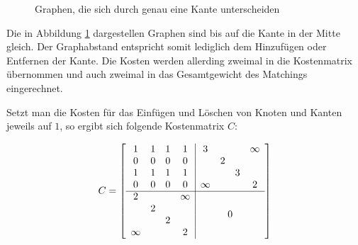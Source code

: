 \begin{figure}[htb]
\centering
\hspace*{\fill}
\hspace*{\fill}
\hspace*{\fill}
\caption{Graphen, die sich durch genau eine Kante unterscheiden}
\label{pic:BspBipMatching}
\end{figure}

Die in Abbildung \ref{pic:BspBipMatching} dargestellen Graphen sind bis auf die Kante 
in der Mitte gleich. Der Graphabstand entspricht somit lediglich dem Hinzufügen oder Entfernen 
der Kante. Die Kosten werden allerding zweimal in die Kostenmatrix übernommen und 
auch zweimal in das Gesamtgewicht des Matchings eingerechnet. 

Setzt man die Kosten für das Einfügen und Löschen von Knoten und Kanten jeweils auf $1$,
so ergibt sich folgende Kostenmatrix $C$:

\[
C=\left [
\begin{array}{cccc|cccc}
    1 & 1 & 1 & 1 & 3 &   &   & \infty \\
    0 & 0 & 0 & 0 &  & 2 &   &  \\
    1 & 1 & 1 & 1 &   &   & 3 &  \\
    0 & 0 & 0 & 0 &  \infty &   &   & 2 \\
 \cline{1-8}
         2 &   &   & \infty & \multicolumn{4}{c}{\multirow{4}{*}{0}}\\
           & 2 &   &  \\
           &   & 2 &  \\
    \infty &   &   & 2 \\

\end{array} \right ] 
\]

